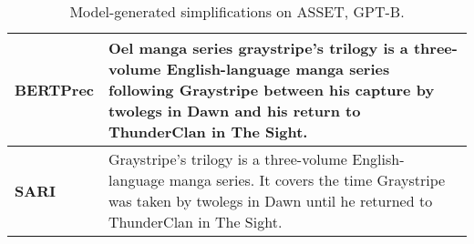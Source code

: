 \documentclass[11pt]{article}
\begin{document}
\begin{table*}[t]
\begin{tabular}{@{}lp{}@{}}
\hline
{\bf BERTPrec}      & Oel manga series graystripe's trilogy is a three-volume English-language manga series following Graystripe between his capture by twolegs in Dawn and his return to ThunderClan in The Sight.\\
\hline
{\bf SARI}      & Graystripe's trilogy is a three-volume \textcolor{Mycolor3}{English-language} manga series. It covers the time Graystripe was taken by twolegs in Dawn until he returned to ThunderClan in The Sight.
\\
\bottomrule
\end{tabular}
\caption{Model-generated simplifications on ASSET, GPT-B.}
\label{tab:examples}
\end{table*}
\end{document}
